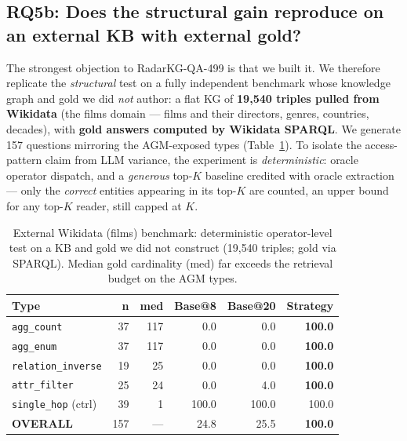 \documentclass[11pt,a4paper]{article}
\newcommand{\qtype}[1]{\texttt{\small #1}}
\begin{document}
\subsection{RQ5b: Does the structural gain reproduce on an external KB with external gold?}
\label{sec:rq5b}
The strongest objection to RadarKG-QA-499 is that we built it. We therefore replicate the \emph{structural} test on a fully independent benchmark whose knowledge graph and gold we did \emph{not} author: a flat KG of \textbf{19{,}540 triples pulled from Wikidata} (the films domain --- films and their directors, genres, countries, decades), with \textbf{gold answers computed by Wikidata SPARQL}. We generate 157 questions mirroring the AGM-exposed types (Table~\ref{tab:ext}). To isolate the access-pattern claim from LLM variance, the experiment is \emph{deterministic}: oracle operator dispatch, and a \emph{generous} top-$K$ baseline credited with oracle extraction --- only the \emph{correct} entities appearing in its top-$K$ are counted, an upper bound for any top-$K$ reader, still capped at $K$.

\begin{table}[h]
\centering\small
\caption{External Wikidata (films) benchmark: deterministic operator-level test on a KB and gold we did not construct (19{,}540 triples; gold via SPARQL). Median gold cardinality (\textsf{med}) far exceeds the retrieval budget on the AGM types.}
\label{tab:ext}
\begin{tabular}{l r r r r r}
\toprule
\textbf{Type} & \textbf{n} & \textbf{med} & \textbf{Base@8} & \textbf{Base@20} & \textbf{Strategy} \\
\midrule
\qtype{agg\_count}        & 37 & 117 & 0.0 & 0.0 & \textbf{100.0} \\
\qtype{agg\_enum}         & 37 & 117 & 0.0 & 0.0 & \textbf{100.0} \\
\qtype{relation\_inverse} & 19 &  25 & 0.0 & 0.0 & \textbf{100.0} \\
\qtype{attr\_filter}      & 25 &  24 & 0.0 & 4.0 & \textbf{100.0} \\
\qtype{single\_hop} (ctrl)& 39 &   1 & 100.0 & 100.0 & 100.0 \\
\midrule
\textbf{OVERALL}          & 157 & --- & 24.8 & 25.5 & \textbf{100.0} \\
\bottomrule
\end{tabular}
\end{table}
\end{document}
